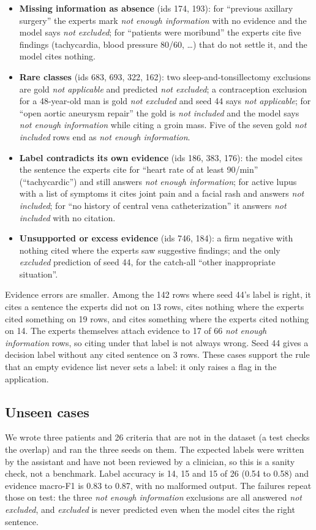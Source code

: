 \documentclass[conference]{IEEEtran}
\begin{document}
\begin{itemize}
\item \textbf{Missing information as absence} (ids 174, 193): for ``previous axillary surgery'' the experts mark \emph{not enough information} with no evidence and the model says \emph{not excluded}; for ``patients were moribund'' the experts cite five findings (tachycardia, blood pressure 80/60, \ldots) that do not settle it, and the model cites nothing.
\item \textbf{Rare classes} (ids 683, 693, 322, 162): two sleep-and-tonsillectomy exclusions are gold \emph{not applicable} and predicted \emph{not excluded}; a contraception exclusion for a 48-year-old man is gold \emph{not excluded} and seed 44 says \emph{not applicable}; for ``open aortic aneurysm repair'' the gold is \emph{not included} and the model says \emph{not enough information} while citing a groin mass. Five of the seven gold \emph{not included} rows end as \emph{not enough information}.
\item \textbf{Label contradicts its own evidence} (ids 186, 383, 176): the model cites the sentence the experts cite for ``heart rate of at least 90/min'' (``tachycardic'') and still answers \emph{not enough information}; for active lupus with a list of symptoms it cites joint pain and a facial rash and answers \emph{not included}; for ``no history of central vena catheterization'' it answers \emph{not included} with no citation.
\item \textbf{Unsupported or excess evidence} (ids 746, 184): a firm negative with nothing cited where the experts saw suggestive findings; and the only \emph{excluded} prediction of seed 44, for the catch-all ``other inappropriate situation''.
\end{itemize}

Evidence errors are smaller. Among the 142 rows where seed 44's label is right, it cites a sentence the experts did not on 13 rows, cites nothing where the experts cited something on 19 rows, and cites something where the experts cited nothing on 14. The experts themselves attach evidence to 17 of 66 \emph{not enough information} rows, so citing under that label is not always wrong. Seed 44 gives a decision label without any cited sentence on 3 rows. These cases support the rule that an empty evidence list never sets a label: it only raises a flag in the application.

\subsection{Unseen cases}
We wrote three patients and 26 criteria that are not in the dataset (a test checks the overlap) and ran the three seeds on them. The expected labels were written by the assistant and have not been reviewed by a clinician, so this is a sanity check, not a benchmark. Label accuracy is 14, 15 and 15 of 26 (0.54 to 0.58) and evidence macro-F1 is 0.83 to 0.87, with no malformed output. The failures repeat those on test: the three \emph{not enough information} exclusions are all answered \emph{not excluded}, and \emph{excluded} is never predicted even when the model cites the right sentence.
\end{document}
